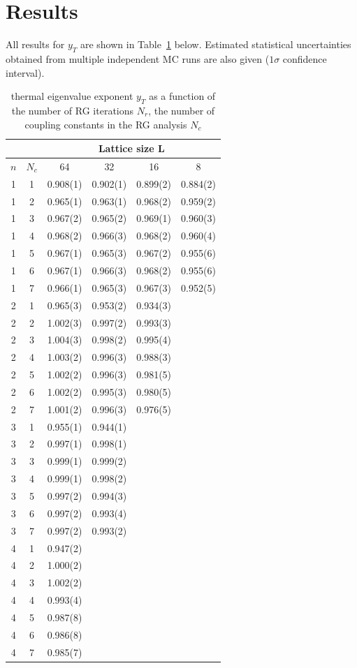 \documentclass[12pt]{article}
\begin{document}
\section{Results}
All results for $y_T$ are shown in Table~\ref{yT} below. Estimated statistical uncertainties obtained from multiple independent MC runs are also given ($1\sigma$ confidence interval).
\begin{table}[H]
\centering
\begin{tabular}{|c|c|c|c|c|c|} 
\hline
 \multicolumn{2}{|c|}{ }& \multicolumn{4}{c|}{Lattice size L}\\
 \hline
 $n$ & $N_c$ & 64 & 32 & 16 & 8 \\
 \hline
 1 & 1 & 0.908(1) & 0.902(1)& 0.899(2) & 0.884(2)\\
 1 & 2 & 0.965(1) & 0.963(1) & 0.968(2)& 0.959(2)\\
 1 & 3 & 0.967(2) & 0.965(2)& 0.969(1) & 0.960(3)\\
 1 & 4 & 0.968(2) & 0.966(3) & 0.968(2) & 0.960(4)\\
 1 & 5 & 0.967(1) & 0.965(3) & 0.967(2) & 0.955(6)\\
 1 & 6 & 0.967(1) & 0.966(3) & 0.968(2) & 0.955(6)\\
 1 & 7 & 0.966(1) & 0.965(3) & 0.967(3) & 0.952(5)\\
 \hline
 2 & 1 & 0.965(3) & 0.953(2) & 0.934(3)&\\
 2 & 2 & 1.002(3) & 0.997(2) & 0.993(3)&\\
 2 & 3 & 1.004(3) & 0.998(2) & 0.995(4)&\\
 2 & 4 & 1.003(2) & 0.996(3) & 0.988(3)&\\
 2 & 5 & 1.002(2) & 0.996(3) & 0.981(5)&\\
 2 & 6 & 1.002(2) & 0.995(3) & 0.980(5)&\\
 2 & 7 & 1.001(2) & 0.996(3) & 0.976(5)&\\
 \hline
 3 & 1 & 0.955(1) & 0.944(1)& & \\
 3 & 2 & 0.997(1) & 0.998(1)& & \\
 3 & 3 & 0.999(1) & 0.999(2)& & \\
 3 & 4 & 0.999(1) & 0.998(2)& & \\
 3 & 5 & 0.997(2) & 0.994(3)& & \\
 3 & 6 & 0.997(2) & 0.993(4)& & \\
 3 & 7 & 0.997(2) & 0.993(2)& & \\
  \hline
 4 & 1 & 0.947(2) & & & \\
 4 & 2 & 1.000(2) & & & \\
 4 & 3 & 1.002(2) & & & \\
 4 & 4 & 0.993(4) & & & \\
 4 & 5 & 0.987(8) & & & \\
 4 & 6 & 0.986(8) & & & \\
 4 & 7 & 0.985(7) & & & \\
 \hline
 \end{tabular}
 \caption{\label{yT}thermal eigenvalue
exponent $y_T$ as a function of the number of RG iterations $N_r$, the number of coupling
constants in the RG analysis $N_c$}
\end{table}
\end{document}
